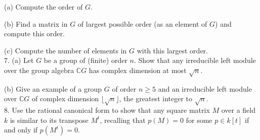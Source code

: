 \documentclass[11pt]{article}
\newcommand{\C}{\mathbb{C}}
\begin{document}
(a) Compute the order of $G$.

(b) Find a matrix in $G$ of largest possible order (as an element of $G$) and compute this order.

(c) Compute the number of elements in $G$ with this largest order. \\


7. (a) Let $G$ be a group of (finite) order $n$. Show that any irreducible left module
over the group algebra $\C G$ has complex dimension at most $\sqrt{n}$.

(b) Give an example of a group $G$ of order $n\ge 5$ and an irreducible left module over $\C G$ of complex dimension $\lfloor \sqrt{n}\rfloor$, the greatest integer to $\sqrt{n}$. \\

8. Use the rational canonical form to show that any square matrix $M$ over a field
$k$ is similar to its transpose $M^t$, recalling that $p(M) = 0$ for some $p\in k[t]$ if and only if $p(M^t) = 0$. 
\end{document}
